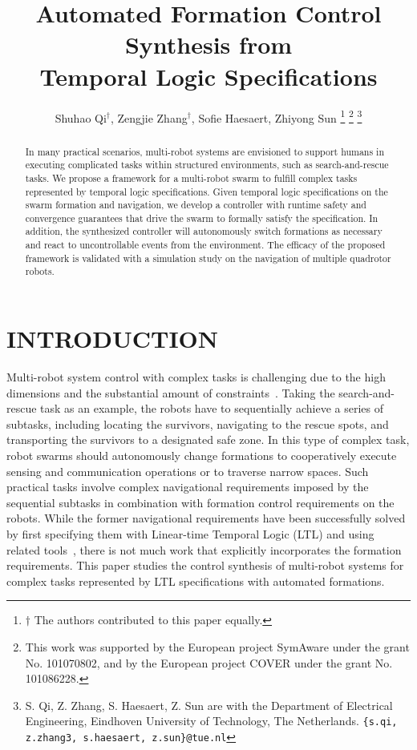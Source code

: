 \documentclass[letterpaper, 10 pt, conference]{ieeeconf}
\title{\LARGE \bf Automated Formation Control Synthesis from \\ Temporal Logic Specifications}
\author{Shuhao Qi$^{\dagger}$, Zengjie Zhang$^{\dagger}$, Sofie Haesaert, Zhiyong Sun%
\thanks{$\dagger$ The authors contributed to this paper equally.}
\thanks{This work was supported by the European project SymAware under the grant No. 101070802, and by the European project COVER under the grant No. 101086228.}
\thanks{S. Qi, Z. Zhang, S. Haesaert, Z. Sun are with the Department of Electrical Engineering, Eindhoven University of Technology, The Netherlands.
        {\tt\small \{s.qi, z.zhang3, s.haesaert, z.sun\}@tue.nl}}%
}
\begin{document}
\maketitle
\thispagestyle{empty}
\pagestyle{empty}


\begin{abstract}
In many practical scenarios, multi-robot systems are envisioned to support humans in executing complicated tasks within structured environments, such as search-and-rescue tasks. We propose a framework for a multi-robot swarm to fulfill complex tasks represented by temporal logic specifications. Given temporal logic specifications on the swarm formation and navigation, we develop a controller with runtime safety and convergence guarantees that drive the swarm to formally satisfy the specification. In addition, the synthesized controller will autonomously switch formations as necessary and react to uncontrollable events from the environment. The efficacy of the proposed framework is validated with a simulation study on the navigation of multiple quadrotor robots.
\end{abstract}


\section{INTRODUCTION}
\label{sec:intro}

Multi-robot system control with complex tasks is challenging due to the high dimensions and the substantial amount of constraints~\cite{chen2022}. Taking the search-and-rescue task as an example, the robots have to sequentially achieve a series of subtasks, including locating the survivors, navigating to the rescue spots, and transporting the survivors to a designated safe zone. In this type of complex task, robot swarms should autonomously change formations to cooperatively execute sensing and communication operations or to traverse narrow spaces. Such practical tasks involve complex navigational requirements imposed by the sequential subtasks in combination with formation control requirements on the robots. While the former navigational requirements have been successfully solved by first specifying them with Linear-time Temporal Logic (LTL) and using related tools~\cite{calin2013ijrr, 2009tro}, there is not much work that explicitly incorporates the formation requirements. This paper studies the control synthesis of multi-robot systems for complex tasks represented by LTL specifications with automated formations.
\end{document}
